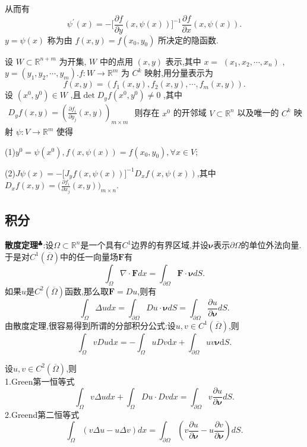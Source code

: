 从而有  
$$
\psi^{\prime}(x)=-\Big[\frac{\partial f}{\partial y}(x,\psi(x))\Big]^{-1}\frac{\partial f}{\partial x}(x,\psi(x)).
$$
$y=\psi(x)$ 称为由 $f(x,y)=f(x_{0},y_{0})$ 所决定的隐函数.
\begin{tcolorbox}[colback=KuangNei,colframe=BianKuang,title=\textbf{隐映射定理},sharpish corners]
设 $W\subset\mathbb{R}^{n+m}$ 为开集, $W$ 中的点用 $(x,y)$ 表示,其中 $x=$ $\left(x_{1},x_{2},\cdots,x_{n}\right)$ ,$y=(y_{1},y_{2},\cdots,y_{m}).f:W\to\mathbb{R}^{m}$ 为 $C^{k}$ 映射,用分量表示为  
$$
f(x,y)=(f_{1}(x,y),f_{2}(x,y),\cdots,f_{m}(x,y)).
$$
设 $(x^{0},y^{0})\in W$ ,且$\operatorname*{det}D_{y}f(x^{0},y^{0})\neq0$ ,其中 $\begin{array}{r}{D_{y}f(x,y)=\left(\frac{\partial f_{i}}{\partial y_{j}}(x,y)\right)_{m\times m}}\end{array}$ 则存在 $x^{0}$ 的开邻域 $V\subset\mathbb{R}^{n}$ 以及唯一的 $C^{k}$ 映射 $\psi:V\to{\mathbb{R}}^{m}$ 使得\par  
(1)$y^{0}=\psi(x^{0}),f(x,\psi(x))=f(x_{0},y_{0}),\forall x\in V;$\par
(2)$J\psi(x)=-\big[J_{y}f(x,\psi(x))\big]^{-1}D_{x}f(x,\psi(x))$,其中$D_{x}f(x,y)=\Big(\frac{\partial f_{i}}{\partial x_{j}}(x,y)\Big)_{m\times n}.$
\end{tcolorbox}
\subsection{积分}
\textbf{散度定理}$^\clubsuit $:设$\Omega\subset\mathbb{R}^n$是一个具有$C^1$边界的有界区域,并设$\mathbf{\nu} $表示$\partial\Omega$的单位外法向量.于是对$C^1(\overline{\Omega})$中的任一向量场$\mathbf{F}$有
$$
\int_{\Omega}\nabla\cdot\mathbf{F}dx=\int_{\partial\Omega}\mathbf{F}\cdot\mathbf{\nu}dS.
$$
如果$u$是$C^2(\overline{\Omega})$函数,那么取$\mathbf{F}=Du$,则有
$$
\int_{\Omega}\Delta u dx=\int_{\partial\Omega}Du\cdot\mathbf{\nu}dS=\int_{\partial\Omega}\frac{\partial u}{\partial\mathbf{\nu}}dS.
$$
由散度定理,很容易得到所谓的分部积分公式:设$u,v\in C^1(\overline{\Omega})$,则
$$
\int_{\Omega}vDu\mathrm{d}x=-\int_{\Omega}uDv\mathrm{d}x+\int_{\partial\Omega}uv\mathbf{\nu}\mathrm{d}S.
$$
\begin{tcolorbox}[colback=KuangNei,colframe=BianKuang,title=\textbf{Green恒等式},sharpish corners]
    设$u,v\in C^2(\overline{\Omega})$,则\\
    1.Green第一恒等式
    $$
    \int_{\Omega}v\Delta u dx+\int_{\Omega}Du\cdot Dvdx=\int_{\partial\Omega}v\frac{\partial u}{\partial \mathbf{\nu}}dS.
    $$
    2.Greend第二恒等式
    $$
    \int_{\Omega}\left(v\Delta u-u\Delta v\right)dx=\int_{\partial\Omega}\left(v\frac{\partial u}{\partial \mathbf{\nu}}-u\frac{\partial v}{\partial \mathbf{\nu}}\right)dS.
    $$
\end{tcolorbox}






